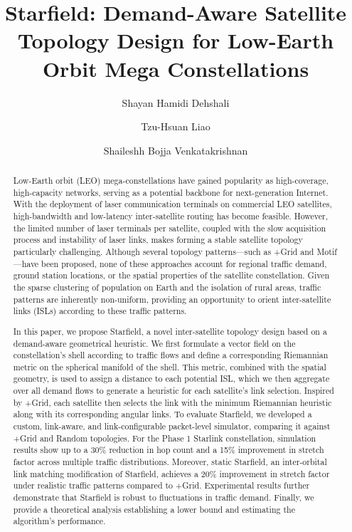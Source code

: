 \documentclass[acmsmall, screen]{acmart}
\begin{document}
\title{Starfield: Demand-Aware Satellite Topology Design for Low-Earth Orbit Mega Constellations}

\author{Shayan Hamidi Dehshali}
\author{Tzu-Hsuan Liao}
\author{Shaileshh Bojja Venkatakrishnan}

\begin{abstract}
Low-Earth orbit (LEO) mega-constellations have gained popularity as high-coverage, high-capacity networks, serving as a potential backbone for next-generation Internet. With the deployment of laser communication terminals on commercial LEO satellites, high-bandwidth and low-latency inter-satellite routing has become feasible. However, the limited number of laser terminals per satellite, coupled with the slow acquisition process and instability of laser links, makes forming a stable satellite topology particularly challenging. Although several topology patterns—such as +Grid and Motif—have been proposed, none of these approaches account for regional traffic demand, ground station locations, or the spatial properties of the satellite constellation. Given the sparse clustering of population on Earth and the isolation of rural areas, traffic patterns are inherently non-uniform, providing an opportunity to orient inter-satellite links (ISLs) according to these traffic patterns.

In this paper, we propose Starfield, a novel inter-satellite topology design based on a demand-aware geometrical heuristic. We first formulate a vector field on the constellation’s shell according to traffic flows and define a corresponding Riemannian metric on the spherical manifold of the shell. This metric, combined with the spatial geometry, is used to assign a distance to each potential ISL, which we then aggregate over all demand flows to generate a heuristic for each satellite’s link selection. Inspired by +Grid, each satellite then selects the link with the minimum Riemannian heuristic along with its corresponding angular links. To evaluate Starfield, we developed a custom, link-aware, and link-configurable packet-level simulator, comparing it against +Grid and Random topologies. For the Phase 1 Starlink constellation, simulation results show up to a 30\% reduction in hop count and a 15\% improvement in stretch factor across multiple traffic distributions. Moreover, static Starfield, an inter-orbital link matching modification of Starfield, achieves a 20\% improvement in stretch factor under realistic traffic patterns compared to +Grid. Experimental results further demonstrate that Starfield is robust to fluctuations in traffic demand. Finally, we provide a theoretical analysis establishing a lower bound and estimating the algorithm’s performance.
\end{abstract}
\end{document}
